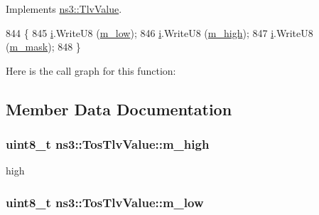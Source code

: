Implements \hyperlink{classns3_1_1TlvValue_aeec8825728398e18337efd9cb40a2aa4}{ns3\+::\+Tlv\+Value}.


\begin{DoxyCode}
844 \{
845   \hyperlink{bernuolliDistribution_8m_a6f6ccfcf58b31cb6412107d9d5281426}{i}.WriteU8 (\hyperlink{classns3_1_1TosTlvValue_ae1bd887c20f9b4c2d38e8c9fb86992fe}{m\_low});
846   \hyperlink{bernuolliDistribution_8m_a6f6ccfcf58b31cb6412107d9d5281426}{i}.WriteU8 (\hyperlink{classns3_1_1TosTlvValue_a09254713ad36ae1d2f63f867f1e34784}{m\_high});
847   \hyperlink{bernuolliDistribution_8m_a6f6ccfcf58b31cb6412107d9d5281426}{i}.WriteU8 (\hyperlink{classns3_1_1TosTlvValue_acf7548f92749ca8b7104b2bb6968fc15}{m\_mask});
848 \}
\end{DoxyCode}


Here is the call graph for this function\+:




\subsection{Member Data Documentation}
\subsubsection[{\texorpdfstring{m\+\_\+high}{m_high}}]{\setlength{\rightskip}{0pt plus 5cm}uint8\+\_\+t ns3\+::\+Tos\+Tlv\+Value\+::m\+\_\+high\hspace{0.3cm}{\ttfamily [private]}}\hypertarget{classns3_1_1TosTlvValue_a09254713ad36ae1d2f63f867f1e34784}{}\label{classns3_1_1TosTlvValue_a09254713ad36ae1d2f63f867f1e34784}


high 

\subsubsection[{\texorpdfstring{m\+\_\+low}{m_low}}]{\setlength{\rightskip}{0pt plus 5cm}uint8\+\_\+t ns3\+::\+Tos\+Tlv\+Value\+::m\+\_\+low\hspace{0.3cm}{\ttfamily [private]}}\hypertarget{classns3_1_1TosTlvValue_ae1bd887c20f9b4c2d38e8c9fb86992fe}{}\label{classns3_1_1TosTlvValue_ae1bd887c20f9b4c2d38e8c9fb86992fe}


